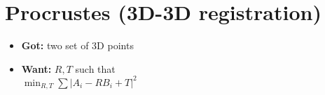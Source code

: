 \section*{Procrustes (3D-3D registration)}
\begin{itemize}
  \item \textbf{Got:} two set of 3D points
  \item \textbf{Want:} $R, T$ such that\\
    $\min_{R,T} \sum |A_i - R B_i +T|^2$
\end{itemize}
